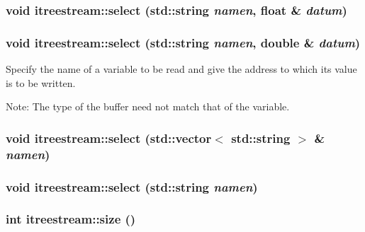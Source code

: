 \hypertarget{classitreestream_a12}{
\subsubsection[select]{\setlength{\rightskip}{0pt plus 5cm}void itreestream::select (std::string {\em namen}, float \& {\em datum})}}
\label{classitreestream_a12}


\hypertarget{classitreestream_a11}{
\subsubsection[select]{\setlength{\rightskip}{0pt plus 5cm}void itreestream::select (std::string {\em namen}, double \& {\em datum})}}
\label{classitreestream_a11}


Specify the name of a variable to be read and give the address to which its value is to be written. 

Note: The type of the buffer need not match that of the variable. \hypertarget{classitreestream_a10}{
\subsubsection[select]{\setlength{\rightskip}{0pt plus 5cm}void itreestream::select (std::vector$<$ std::string $>$ \& {\em namen})}}
\label{classitreestream_a10}


\hypertarget{classitreestream_a9}{
\subsubsection[select]{\setlength{\rightskip}{0pt plus 5cm}void itreestream::select (std::string {\em namen})}}
\label{classitreestream_a9}


\hypertarget{classitreestream_a21}{
\subsubsection[size]{\setlength{\rightskip}{0pt plus 5cm}int itreestream::size ()}}
\label{classitreestream_a21}


